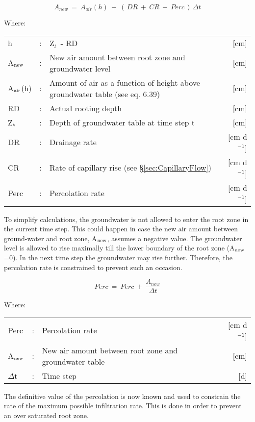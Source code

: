 \begin{equation}
\label{eq:6.45}
 A_{new} ~=~ A_{air} (h) ~+~ (\, DR ~+~ CR ~-~ Perc\, )\, \Delta t
\end{equation}

Where:\\[5pt]
\begin{tabularx}{\textwidth}{llXr}
h &:& Z$_{t~}$ - RD & [cm]\\
A$_{{\rm new}}$ &:& New air amount between root zone and groundwater level  & [cm]\\
A$_{{\rm air}}$(h) &:& Amount of air as a function of height above groundwater
   table  (see eq. 6.39) & [cm]\\
RD &:& Actual rooting depth  & [cm]\\
Z$_{{\rm t}}$ &:& Depth of groundwater table at time step t  & [cm]\\
DR &:& Drainage rate  & [cm d$^{{\rm -1}}$]\\
CR &:& Rate of capillary rise (see \S \ref{sec:CapillaryFlow})  & [cm d$^{{\rm -1}}$]\\
Perc &:& Percolation rate  & [cm d$^{{\rm -1}}$]\\
\end{tabularx}

To simplify calculations, the groundwater is not allowed to enter the root zone in the
current time step. This could happen in case the new air amount between ground-water
and root zone, A$_{{\rm new}}$, assumes a negative value. The groundwater level is allowed to rise
maximally till the lower boundary of the root zone (A$_{{\rm new}}$=0). In the next time step the
groundwater may rise further. Therefore, the percolation rate is constrained to prevent
such an occasion. 

\begin{equation}
\label{eq:6.46}
Perc ~=~Perc ~+~{\frac{A _{new} }{\Delta t}}
\end{equation}

Where:\\[5pt]
\begin{tabularx}{\textwidth}{llXr}
Perc &:& Percolation rate   & [cm d$^{{\rm -1}}$]\\
A$_{{\rm new}}$ &:& New air amount between root zone and groundwater table  & [cm]\\
$\Delta$t &:& Time step  & [d]\\
\end{tabularx}

The definitive value of the percolation is now known and used to constrain the rate of the
maximum possible infiltration rate. This is done in order to prevent an over saturated root
zone.


